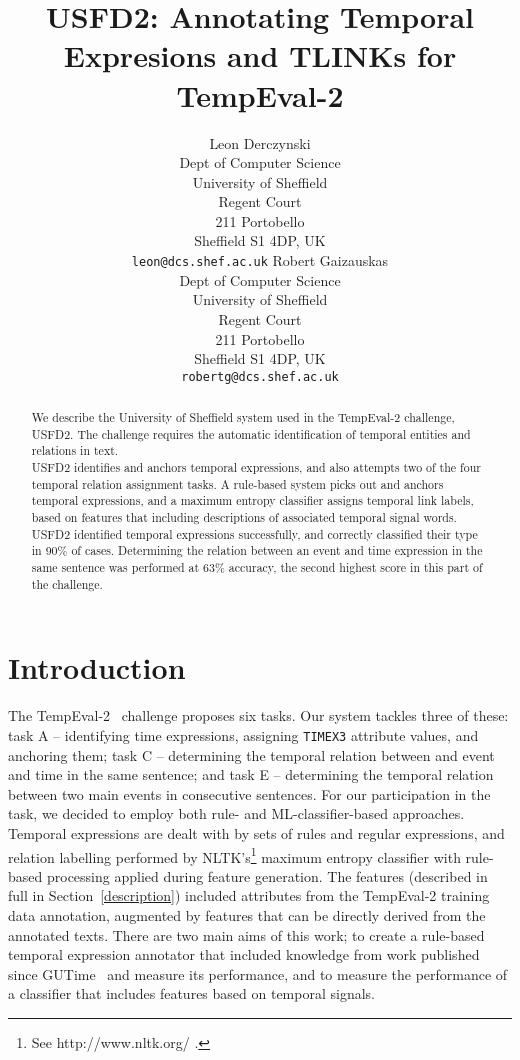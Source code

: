\documentclass[11pt]{article}
\title{USFD2: Annotating Temporal Expresions and TLINKs for TempEval-2}
\author{Leon Derczynski\\
  Dept of Computer Science\\ 
  University of Sheffield\\ 
  Regent Court\\
  211 Portobello\\ 
  Sheffield S1 4DP, UK\\ 
  {\tt leon@dcs.shef.ac.uk} \And
  Robert Gaizauskas\\
  Dept of Computer Science\\
  University of Sheffield\\
  Regent Court\\
  211 Portobello\\
  Sheffield S1 4DP, UK\\
  {\tt robertg@dcs.shef.ac.uk}
}
\date{}
\begin{document}
\maketitle
\begin{abstract}
We describe the University of Sheffield system used in the TempEval-2 challenge, USFD2. The challenge requires the automatic identification of temporal entities and relations in text. \\USFD2 identifies and anchors temporal expressions, and also attempts two of the four temporal relation assignment tasks. A rule-based system picks out and anchors temporal expressions, and a maximum entropy classifier assigns temporal link labels, based on features that including descriptions of associated temporal signal words. USFD2 identified temporal expressions successfully, and correctly classified their type in 90\% of cases. Determining the relation between an event and time expression in the same sentence was performed at 63\% accuracy, the second highest score in this part of the challenge.
\end{abstract}

\section{Introduction}
The TempEval-2~\cite{pustejovsky2009semeval} challenge proposes six tasks. Our system tackles three of these: task A -- identifying time expressions, assigning {\tt TIMEX3} attribute values, and anchoring them; task C -- determining the temporal relation between and event and time in the same sentence; and task E -- determining the temporal relation between two main events in consecutive sentences. For our participation in the task, we decided to employ both rule- and ML-classifier-based approaches. Temporal expressions are dealt with by sets of rules and regular expressions, and relation labelling performed by NLTK's\footnote{See http://www.nltk.org/ .} maximum entropy classifier with rule-based processing applied during feature generation. The features (described in full in Section~\ref{description}) included attributes from the TempEval-2 training data annotation, augmented by features that can be directly derived from the annotated texts. There are two main aims of this work; to create a rule-based temporal expression annotator that included knowledge from work published since GUTime~\cite{mani2000robust} and measure its performance, and to measure the performance of a classifier that includes features based on temporal signals.
\end{document}
